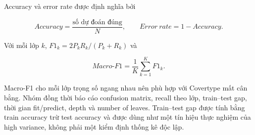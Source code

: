 Accuracy và error rate được định nghĩa bởi

\begin{equation}
    Accuracy=\frac{\text{số dự đoán đúng}}{N},
    \qquad Error\ rate=1-Accuracy.
    \label{eq:accuracy-error}
\end{equation}

Với mỗi lớp $k$, $F1_k=2P_kR_k/(P_k+R_k)$ và

\begin{equation}
    Macro\text{-}F1=\frac{1}{K}\sum_{k=1}^{K}F1_k.
    \label{eq:macro-f1}
\end{equation}

Macro-F1 cho mỗi lớp trọng số ngang nhau nên phù hợp với Covertype mất cân bằng. Nhóm đồng thời báo cáo confusion matrix, recall theo lớp, train--test gap, thời gian fit/predict, depth và number of leaves. Train--test gap được tính bằng train accuracy trừ test accuracy và được dùng như một tín hiệu thực nghiệm của high variance, không phải một kiểm định thống kê độc lập.
